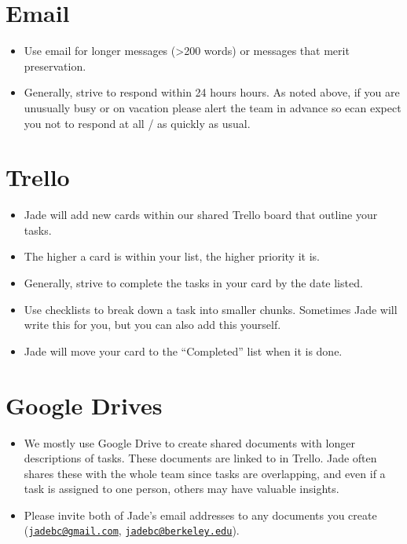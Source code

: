 \documentclass[]{book}
\providecommand{\tightlist}{%
  \setlength{\itemsep}{0pt}\setlength{\parskip}{0pt}}
\begin{document}
\hypertarget{email}{%
\section{Email}\label{email}}

\begin{itemize}
\tightlist
\item
  Use email for longer messages (\textgreater{}200 words) or messages that merit preservation.
\item
  Generally, strive to respond within 24 hours hours. As noted above, if you are unusually busy or on vacation please alert the team in advance so ecan expect you not to respond at all / as quickly as usual.
\end{itemize}

\hypertarget{trello}{%
\section{Trello}\label{trello}}

\begin{itemize}
\tightlist
\item
  Jade will add new cards within our shared Trello board that outline your tasks.
\item
  The higher a card is within your list, the higher priority it is.
\item
  Generally, strive to complete the tasks in your card by the date listed.
\item
  Use checklists to break down a task into smaller chunks. Sometimes Jade will write this for you, but you can also add this yourself.
\item
  Jade will move your card to the ``Completed'' list when it is done.
\end{itemize}

\hypertarget{google-drives}{%
\section{Google Drives}\label{google-drives}}

\begin{itemize}
\tightlist
\item
  We mostly use Google Drive to create shared documents with longer descriptions of tasks. These documents are linked to in Trello. Jade often shares these with the whole team since tasks are overlapping, and even if a task is assigned to one person, others may have valuable insights.
\item
  Please invite both of Jade's email addresses to any documents you create (\href{mailto:jadebc@gmail.com}{\nolinkurl{jadebc@gmail.com}}, \href{mailto:jadebc@berkeley.edu}{\nolinkurl{jadebc@berkeley.edu}}).
\end{itemize}
\end{document}
